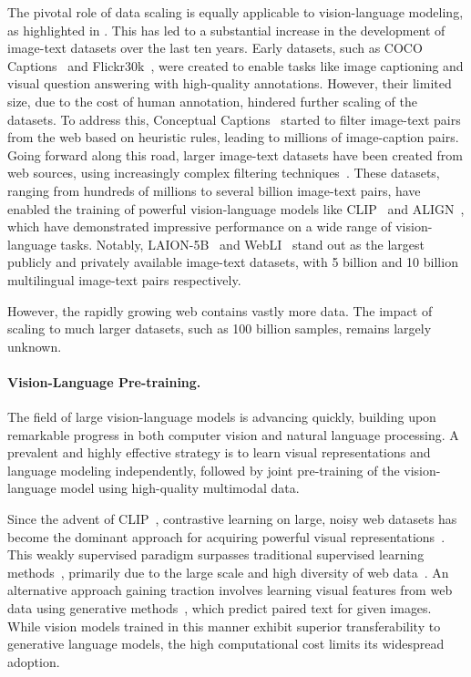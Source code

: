 The pivotal role of data scaling is equally applicable to vision-language modeling, as highlighted in \citet{cherti2023reproducible}. This has led to a substantial increase in the development of image-text datasets over the last ten years. Early datasets, such as COCO Captions~\citep{chen2015microsoft} and Flickr30k~\citep{young2014image}, were created to enable tasks like image captioning and visual question answering with high-quality annotations. However, their limited size, due to the cost of human annotation, hindered further scaling of the datasets. To address this, Conceptual Captions~\citep{sharma2018conceptual} started to filter image-text pairs from the web based on heuristic rules, leading to millions of image-caption pairs. Going forward along this road, larger image-text datasets have been created from web sources, using increasingly complex filtering techniques~\citep{datacomp,fang2023data,dong2025scalable}. These datasets, ranging from hundreds of millions to several billion image-text pairs, have enabled the training of powerful vision-language models like CLIP~\citep{radford2021learning} and ALIGN~\citep{jia2021scaling}, which have demonstrated impressive performance on a wide range of vision-language tasks. Notably, LAION-5B~\citep{schuhmann2022laion} and WebLI~\citep{chen2022pali} stand out as the largest publicly and privately available image-text datasets, with 5 billion and 10 billion multilingual image-text pairs respectively. 

However, the rapidly growing web contains vastly more data. The impact of scaling to much larger datasets, such as 100 billion samples, remains largely unknown.

\paragraph{Vision-Language Pre-training.}

The field of large vision-language models is advancing quickly, building upon remarkable progress in both computer vision and natural language processing. A prevalent and highly effective strategy is to learn visual representations and language modeling independently, followed by joint pre-training of the vision-language model using high-quality multimodal data.

Since the advent of CLIP~\citep{radford2021learning}, contrastive learning on large, noisy web datasets has become the dominant approach for acquiring powerful visual representations~\citep{chen2020simple}. This weakly supervised paradigm surpasses traditional supervised learning methods~\citep{kolesnikov2020big,steiner2021train}, primarily due to the large scale and high diversity of web data~\citep{jia2021scaling,yuan2021florence,pham2023combined,yu2022coca}. An alternative approach gaining traction involves learning visual features from web data using generative methods~\citep{tschannen2024image,wan2024locca}, which predict paired text for given images. While vision models trained in this manner exhibit superior transferability to generative language models, the high computational cost limits its widespread adoption.

